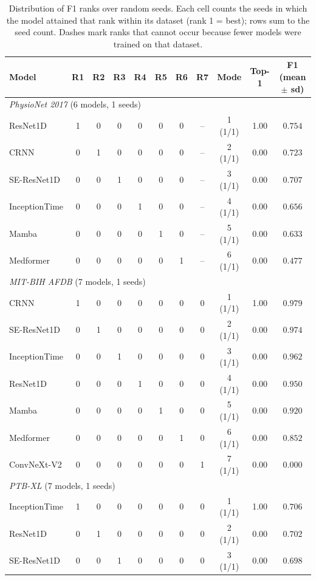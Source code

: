 \begin{table}[ht]
\centering
\caption{Distribution of F1 ranks over random seeds. Each cell counts the seeds in which the model attained that rank within its dataset (rank 1 = best); rows sum to the seed count. Dashes mark ranks that cannot occur because fewer models were trained on that dataset.}
\label{tab:rank_distribution}
\scriptsize
\begin{tabular}{lcccccccccc}
\toprule
Model & R1 & R2 & R3 & R4 & R5 & R6 & R7 & Mode & Top-1 & F1 (mean $\pm$ sd) \\
\midrule
\multicolumn{11}{l}{\textit{PhysioNet 2017} (6 models, 1 seeds)} \\
ResNet1D & 1 & 0 & 0 & 0 & 0 & 0 & -- & 1 (1/1) & 1.00 & $0.754$ \\
CRNN & 0 & 1 & 0 & 0 & 0 & 0 & -- & 2 (1/1) & 0.00 & $0.723$ \\
SE-ResNet1D & 0 & 0 & 1 & 0 & 0 & 0 & -- & 3 (1/1) & 0.00 & $0.707$ \\
InceptionTime & 0 & 0 & 0 & 1 & 0 & 0 & -- & 4 (1/1) & 0.00 & $0.656$ \\
Mamba & 0 & 0 & 0 & 0 & 1 & 0 & -- & 5 (1/1) & 0.00 & $0.633$ \\
Medformer & 0 & 0 & 0 & 0 & 0 & 1 & -- & 6 (1/1) & 0.00 & $0.477$ \\
\midrule
\multicolumn{11}{l}{\textit{MIT-BIH AFDB} (7 models, 1 seeds)} \\
CRNN & 1 & 0 & 0 & 0 & 0 & 0 & 0 & 1 (1/1) & 1.00 & $0.979$ \\
SE-ResNet1D & 0 & 1 & 0 & 0 & 0 & 0 & 0 & 2 (1/1) & 0.00 & $0.974$ \\
InceptionTime & 0 & 0 & 1 & 0 & 0 & 0 & 0 & 3 (1/1) & 0.00 & $0.962$ \\
ResNet1D & 0 & 0 & 0 & 1 & 0 & 0 & 0 & 4 (1/1) & 0.00 & $0.950$ \\
Mamba & 0 & 0 & 0 & 0 & 1 & 0 & 0 & 5 (1/1) & 0.00 & $0.920$ \\
Medformer & 0 & 0 & 0 & 0 & 0 & 1 & 0 & 6 (1/1) & 0.00 & $0.852$ \\
ConvNeXt-V2 & 0 & 0 & 0 & 0 & 0 & 0 & 1 & 7 (1/1) & 0.00 & $0.000$ \\
\midrule
\multicolumn{11}{l}{\textit{PTB-XL} (7 models, 1 seeds)} \\
InceptionTime & 1 & 0 & 0 & 0 & 0 & 0 & 0 & 1 (1/1) & 1.00 & $0.706$ \\
ResNet1D & 0 & 1 & 0 & 0 & 0 & 0 & 0 & 2 (1/1) & 0.00 & $0.702$ \\
SE-ResNet1D & 0 & 0 & 1 & 0 & 0 & 0 & 0 & 3 (1/1) & 0.00 & $0.698$ \\

\end{tabular}
\end{table}
